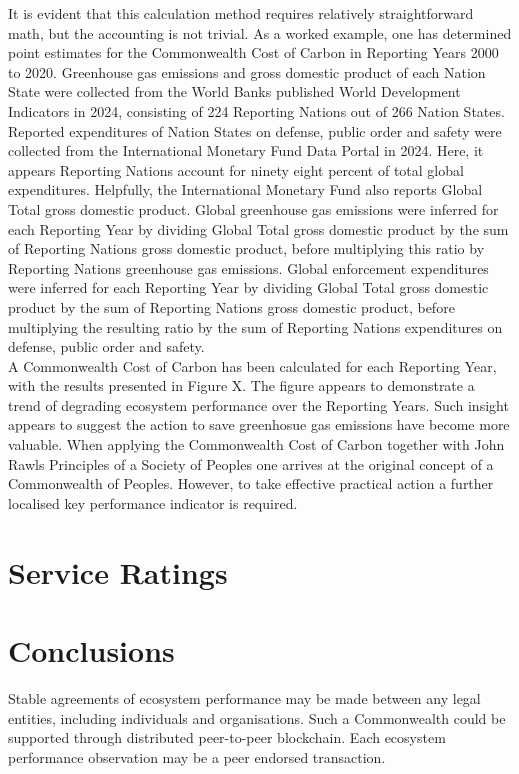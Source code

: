 \documentclass[11pt, oneside]{article}   	%
\begin{document}
It is evident that this calculation method requires relatively straightforward math, but the accounting is not trivial.
As a worked example, one has determined point estimates for the Commonwealth Cost of Carbon in Reporting Years 2000 to 2020.
Greenhouse gas emissions and gross domestic product of each Nation State were collected from the World Banks published World Development Indicators in 2024, consisting of 224 Reporting Nations out of 266 Nation States.
Reported expenditures of Nation States on defense, public order and safety were collected from the International Monetary Fund Data Portal in 2024.
Here, it appears Reporting Nations account for ninety eight percent of total global expenditures.
Helpfully, the International Monetary Fund also reports Global Total gross domestic product.
Global greenhouse gas emissions were inferred for each Reporting Year by dividing Global Total gross domestic product by the sum of Reporting Nations gross domestic product, before multiplying this ratio by Reporting Nations greenhouse gas emissions.
Global enforcement expenditures were inferred for each Reporting Year by dividing Global Total gross domestic product by the sum of Reporting Nations gross domestic product, before multiplying the resulting ratio by the sum of Reporting Nations expenditures on defense, public order and safety.\\

A Commonwealth Cost of Carbon has been calculated for each Reporting Year, with the results presented in Figure X.
The figure appears to demonstrate a trend of degrading ecosystem performance over the Reporting Years.
Such insight appears to suggest the action to save greenhosue gas emissions have become more valuable.
When applying the Commonwealth Cost of Carbon together with John Rawls Principles of a Society of Peoples one arrives at the original concept of a Commonwealth of Peoples.
However, to take effective practical action a further localised key performance indicator is required.\\

\section{Service Ratings}


\section{Conclusions}
Stable agreements of ecosystem performance may be made between any legal entities, including individuals and organisations.
Such a Commonwealth could be supported through distributed peer-to-peer blockchain.
Each ecosystem performance observation may be a peer endorsed transaction.
\end{document}
